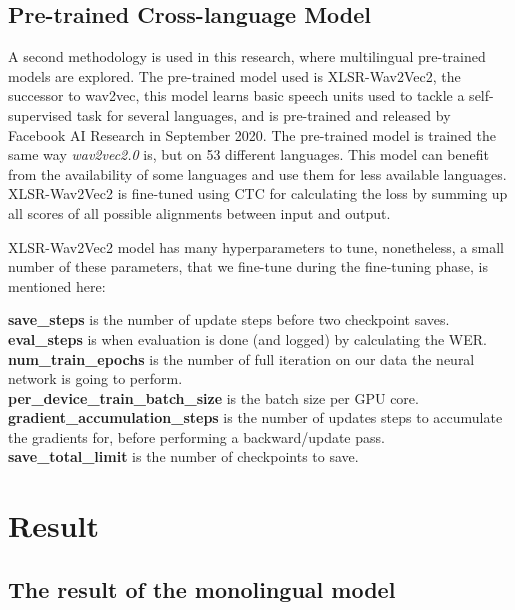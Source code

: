 \documentclass[
  a4paper,
]{article}
\begin{document}
\hypertarget{pre-trained-cross-language-model}{%
\subsection{Pre-trained Cross-language
Model}\label{pre-trained-cross-language-model}}

A second methodology is used in this research, where multilingual
pre-trained models are explored. The pre-trained model used is
XLSR-Wav2Vec2, the successor to wav2vec, this model learns basic speech
units used to tackle a self-supervised task for several languages, and
is pre-trained and released by Facebook AI Research in September 2020.
The pre-trained model is trained the same way \emph{wav2vec2.0} is, but
on 53 different languages. This model can benefit from the availability
of some languages and use them for less available languages.
XLSR-Wav2Vec2 is fine-tuned using CTC for calculating the loss by
summing up all scores of all possible alignments between input and
output.

XLSR-Wav2Vec2 model has many hyperparameters to tune, nonetheless, a
small number of these parameters, that we fine-tune during the
fine-tuning phase, is mentioned here:

\noindent  \textbf{save\_steps} is the number of update steps before two
checkpoint saves.\\
\textbf{eval\_steps} is when evaluation is done (and logged) by
calculating the WER.\\
\textbf{num\_train\_epochs} is the number of full iteration on our data
the neural network is going to perform.\\
\textbf{per\_device\_train\_batch\_size} is the batch size per GPU
core.\\
\textbf{gradient\_accumulation\_steps} is the number of updates steps to
accumulate the gradients for, before performing a backward/update
pass.\\
\textbf{save\_total\_limit} is the number of checkpoints to save.

\newpage

\hypertarget{result}{%
\section{Result}\label{result}}

\hypertarget{the-result-of-the-monolingual-model}{%
\subsection{The result of the monolingual
model}\label{the-result-of-the-monolingual-model}}
\end{document}
